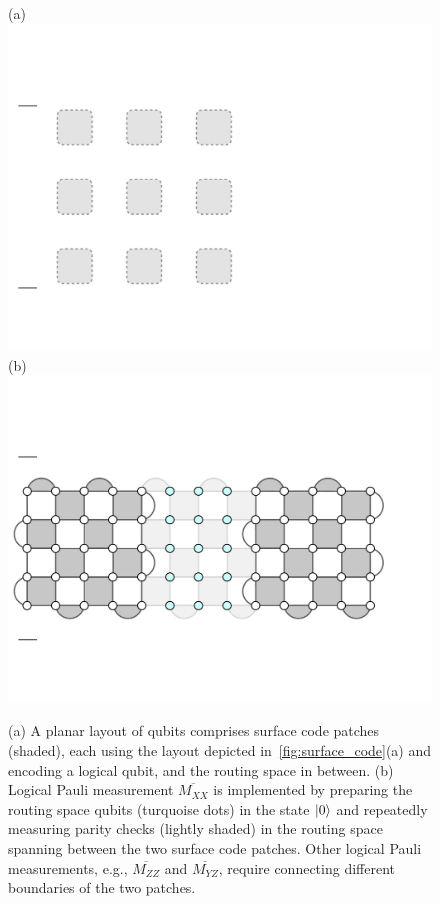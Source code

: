 \begin{refsection}
\begin{figure}[h]
\centering
(a)\includegraphics[draft=false,height=0.17\textheight]{figures/fig_planar}\quad\quad\quad
(b)\includegraphics[draft=false,height=0.17\textheight]{figures/fig_surgery}
\caption{
(a) A planar layout of qubits comprises surface code patches (shaded), each using the layout depicted in~\cref{fig:surface_code}(a) and encoding a logical qubit, and the routing space in between. 
(b) Logical Pauli measurement $\overline{M_{XX}}$ is implemented by preparing the routing space qubits (turquoise dots) in the state $\lvert0\rangle$ and repeatedly measuring parity checks (lightly shaded) in the routing space spanning between the two surface code patches.
Other logical Pauli measurements, e.g., $\overline{M_{ZZ}}$ and $\overline{M_{YZ}}$, require connecting different boundaries of the two patches.
}
\label{fig:planar}
\end{figure}



\end{refsection}

